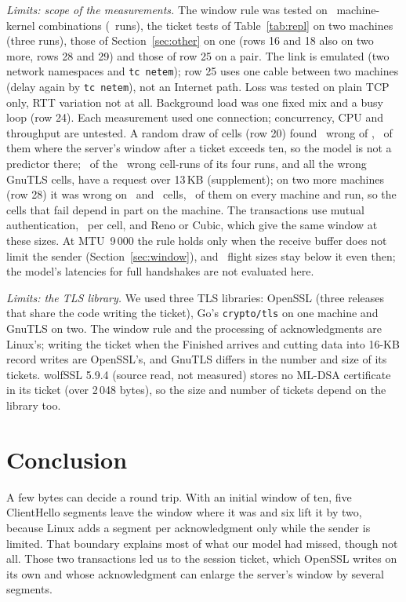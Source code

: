 \documentclass[sigconf,9pt,nonacm]{acmart}
\begin{document}
\emph{Limits: scope of the measurements.} The window rule was tested on \NCombW\ machine-kernel combinations (\NRunsW\ runs), the ticket tests of Table~\ref{tab:repl} on two machines (three runs), those of Section~\ref{sec:other} on one (rows 16 and 18 also on two more, rows 28 and 29) and those of row 25 on a pair. The link is emulated (two network namespaces and \texttt{tc netem}); row 25 uses one cable between two machines (delay again by \texttt{tc netem}), not an Internet path. Loss was tested on plain TCP only, RTT variation not at all. Background load was one fixed mix and a busy loop (row 24). Each measurement used one connection; concurrency, CPU and throughput are untested. A random draw of cells (row 20) found \GnineWrongW\ wrong of \GnineN, \TktWrongAfterW\ of them where the server's window after a ticket exceeds ten, so the model is not a predictor there; \DomLargeWrong\ of the \DomWrongTotal\ wrong cell-runs of its four runs, and all the wrong GnuTLS cells, have a request over 13\,KB (supplement); on two more machines (row 28) it was wrong on \GnineCellsWrongGx\ and \GnineCellsWrongOp\ cells, \GnineCellsEvery\ of them on every machine and run, so the cells that fail depend in part on the machine. The transactions use mutual authentication, \NPerCell\ per cell, and Reno or Cubic, which give the same window at these sizes. At MTU~9\,000 the rule holds only when the receive buffer does not limit the sender (Section~\ref{sec:window}), and \NineFailNW\ flight sizes stay below it even then; the model's latencies for full handshakes are not evaluated here.\par\emph{Limits: the TLS library.} We used three TLS libraries: OpenSSL (three releases that share the code writing the ticket), Go's \texttt{crypto/tls} on one machine and GnuTLS on two. The window rule and the processing of acknowledgments are Linux's; writing the ticket when the Finished arrives and cutting data into 16-KB record writes are OpenSSL's, and GnuTLS differs in the number and size of its tickets. wolfSSL 5.9.4 (source read, not measured) stores no ML-DSA certificate in its ticket (over 2\,048 bytes), so the size and number of tickets depend on the library too.

\section{Conclusion}
A few bytes can decide a round trip. With an initial window of ten, five ClientHello segments leave the window where it was and six lift it by two, because Linux adds a segment per acknowledgment only while the sender is limited. That boundary explains most of what our model had missed, though not all. Those two transactions led us to the session ticket, which OpenSSL writes on its own and whose acknowledgment can enlarge the server's window by several segments.
\end{document}
